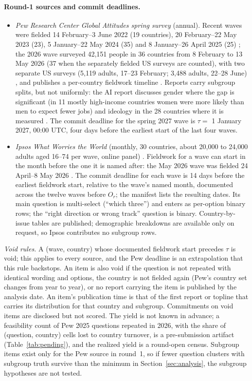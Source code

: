 \documentclass[11pt]{article}
\begin{document}
\paragraph{Round-1 sources and commit deadlines.}
\begin{itemize}
  \item \emph{Pew Research Center Global Attitudes spring survey} (annual). Recent waves were fielded 14 February--3 June 2022 (19 countries), 20 February--22 May 2023 (23), 5 January--22 May 2024 (35) and 8 January--26 April 2025 (25) \citep{pewdatasets2026}; the 2026 wave surveyed 42{,}151 people in 36 countries from 8 February to 13 May 2026 (37 when the separately fielded US surveys are counted), with two separate US surveys (5{,}119 adults, 17--23 February; 3{,}488 adults, 22--28 June) \citep{pew2026ai}, and publishes a per-country fieldwork timeline \citep{pew2026methods}. Reports carry subgroup splits, but not uniformly: the AI report discusses gender where the gap is significant (in 11 mostly high-income countries women were more likely than men to expect fewer jobs) and ideology in the 28 countries where it is measured \citep{pew2026ai}. The commit deadline for the spring 2027 wave is $\tau = $ 1 January 2027, 00:00 UTC, four days before the earliest start of the last four waves.
  \item \emph{Ipsos What Worries the World} (monthly, 30 countries, about 20{,}000 to 24{,}000 adults aged 16--74 per wave, online panel) \citep{ipsoswww2026,ipsos2026may}. Fieldwork for a wave can start in the month before the one it is named after: the May 2026 wave was fielded 24 April--8 May 2026 \citep{ipsos2026may}. The commit deadline for each wave is 14 days before the earliest fieldwork start, relative to the wave's named month, documented across the twelve waves before $O_r$; the manifest lists the resulting dates. Its main question is multi-select (``which three'') and enters as per-option binary rows; the ``right direction or wrong track'' question is binary. Country-by-issue tables are published; demographic breakdowns are available only on request, so Ipsos contributes no subgroup rows.
\end{itemize}
\emph{Void rules.} A (wave, country) whose documented fieldwork start precedes $\tau$ is void; this applies to every source, and the Pew deadline is an extrapolation that this rule backstops. An item is also void if the question is not repeated with identical wording and options, the country is not fielded again (Pew's country set changes from year to year), or no report carrying the item is published by the analysis date. An item's publication time is that of the first report or topline that carries its distribution for that country and subgroup. Commitments on void items are disclosed but not scored. The yield is not known in advance; a feasibility count of Pew 2025 questions repeated in 2026, with the share of (question, country) cells lost to country turnover, is a pre-submission artifact (Table~\ref{tab:pending}), and the realized yield is a round-open census. Subgroup items exist only for the Pew source in round~1, so if fewer question clusters with subgroup truth survive than the minimum in Section~\ref{sec:analysis}, the subgroup hypotheses are not tested.
\end{document}
